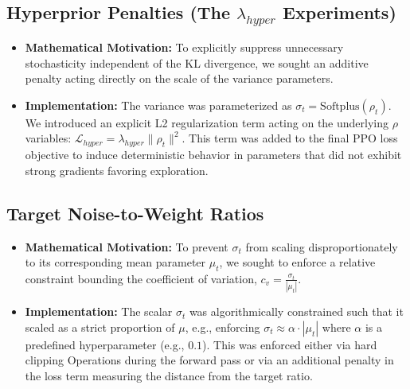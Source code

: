 \documentclass[11pt,a4paper]{article}
\begin{document}
\subsection{Hyperprior Penalties (The $\lambda_{hyper}$ Experiments)}
\begin{itemize}
    \item \textbf{Mathematical Motivation:} To explicitly suppress unnecessary stochasticity independent of the KL divergence, we sought an additive penalty acting directly on the scale of the variance parameters.
    \item \textbf{Implementation:} The variance was parameterized as $\sigma_t = \text{Softplus}(\rho_t)$. We introduced an explicit L2 regularization term acting on the underlying $\rho$ variables: $\mathcal{L}_{hyper} = \lambda_{hyper} \|\rho_t\|^2$. This term was added to the final PPO loss objective to induce deterministic behavior in parameters that did not exhibit strong gradients favoring exploration.
\end{itemize}

\subsection{Target Noise-to-Weight Ratios}
\begin{itemize}
    \item \textbf{Mathematical Motivation:} To prevent $\sigma_t$ from scaling disproportionately to its corresponding mean parameter $\mu_t$, we sought to enforce a relative constraint bounding the coefficient of variation, $c_v = \frac{\sigma_t}{|\mu_t|}$.
    \item \textbf{Implementation:} The scalar $\sigma_t$ was algorithmically constrained such that it scaled as a strict proportion of $\mu$, e.g., enforcing $\sigma_t \approx \alpha \cdot |\mu_t|$ where $\alpha$ is a predefined hyperparameter (e.g., $0.1$). This was enforced either via hard clipping Operations during the forward pass or via an additional penalty in the loss term measuring the distance from the target ratio.
\end{itemize}
\end{document}
